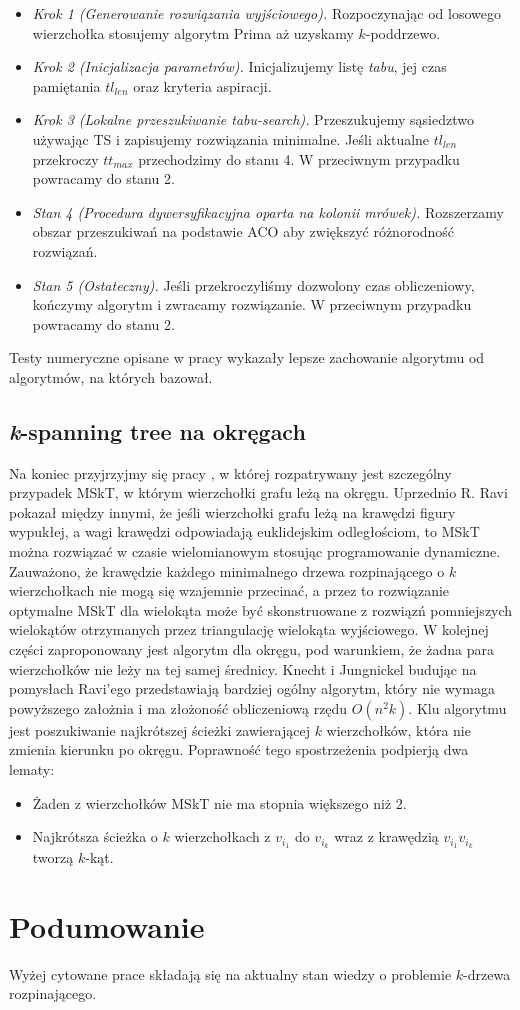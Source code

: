 \documentclass[12pt]{article}
\begin{document}
\begin{itemize}
  \item \textit{Krok 1 (Generowanie rozwiązania wyjściowego).} Rozpoczynając od losowego wierzchołka stosujemy algorytm Prima \cite{prim} aż uzyskamy $k$-poddrzewo.
  \item \textit{Krok 2 (Inicjalizacja parametrów).} Inicjalizujemy listę \textit{tabu}, jej czas pamiętania $tl_{len}$ oraz kryteria aspiracji.
  \item \textit{Krok 3 (Lokalne przeszukiwanie tabu-search).} Przeszukujemy sąsiedztwo używając TS i zapisujemy rozwiązania minimalne. Jeśli aktualne $tl_{len}$ przekroczy $tt_{max}$ przechodzimy do stanu 4. W przeciwnym przypadku powracamy do stanu 2.
  \item \textit{Stan 4 (Procedura dywersyfikacyjna oparta na kolonii mrówek).} Rozszerzamy obszar przeszukiwań na podstawie ACO aby zwiększyć różnorodność rozwiązań.
  \item \textit{Stan 5 (Ostateczny).} Jeśli przekroczyliśmy dozwolony czas obliczeniowy, kończymy algorytm i zwracamy rozwiązanie. W przeciwnym przypadku powracamy do stanu 2. 
\end{itemize}

Testy numeryczne opisane w pracy wykazały lepsze zachowanie algorytmu od algorytmów, na których bazował.

\subsection{\textit{k}-spanning tree na okręgach}

Na koniec przyjrzyjmy się pracy \cite{circles}, w której rozpatrywany jest szczególny przypadek MSkT, w którym wierzchołki grafu leżą na okręgu. Uprzednio R. Ravi \cite{ravi} pokazał między innymi, że jeśli wierzchołki grafu leżą na krawędzi figury wypukłej, a wagi krawędzi odpowiadają euklidejskim odległościom, to MSkT można rozwiązać w czasie wielomianowym stosując programowanie dynamiczne. Zauważono, że krawędzie każdego minimalnego drzewa rozpinającego o $k$ wierzchołkach nie mogą się wzajemnie przecinać, a przez to rozwiązanie optymalne MSkT dla wielokąta może być skonstruowane z rozwiązń pomniejszych wielokątów otrzymanych przez triangulację wielokąta wyjściowego. W kolejnej części zaproponowany jest algorytm dla okręgu, pod warunkiem, że żadna para wierzchołków nie leży na tej samej średnicy.
Knecht i Jungnickel budując na pomysłach Ravi'ego przedstawiają bardziej ogólny algorytm, który nie wymaga powyższego założnia i ma złożoność obliczeniową rzędu $O(n^2k)$. Klu algorytmu jest poszukiwanie najkrótszej ścieżki zawierającej $k$ wierzchołków, która nie zmienia kierunku po okręgu. Poprawność tego spostrzeżenia podpierją dwa lematy:
\begin{itemize}
  \item Żaden z wierzchołków MSkT nie ma stopnia większego niż 2.
  \item Najkrótsza ścieżka o $k$ wierzchołkach z $v_{i_1}$ do $v_{i_k}$ wraz z krawędzią $v_{i_1}v_{i_k}$ tworzą $k$-kąt.
\end{itemize}

\section{Podumowanie}

Wyżej cytowane prace składają się na aktualny stan wiedzy o problemie $k$-drzewa rozpinającego.

\newpage



\end{document}
